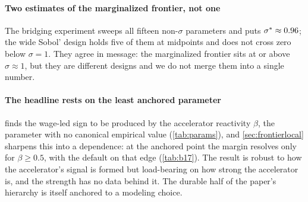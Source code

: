 \paragraph{Two estimates of the marginalized frontier, not one} The bridging
experiment sweeps all fifteen non-$\sigma$ parameters and puts
$\sigma^{\ast} \approx 0.96$; the wide Sobol' design holds five of them at midpoints
and does not cross zero below $\sigma = 1$. They agree in message: the
marginalized frontier sits at or above $\sigma \approx 1$, but they are
different designs and we do not merge them into a single number.

\paragraph{The headline rests on the least anchored parameter} 
finds the wage-led sign to be produced by the accelerator reactivity $\beta$, the
parameter with no canonical empirical value (\cref{tab:params}), and
\cref{sec:frontierlocal} sharpens this into a dependence: at the anchored point
the margin resolves only for $\beta \ge 0.5$, with the default on that edge
(\cref{tab:b17}). The result is robust to how the accelerator's signal is formed
but load-bearing on how strong the accelerator is, and the strength has no data
behind it. The durable half of the paper's hierarchy is itself anchored to a
modeling choice.

